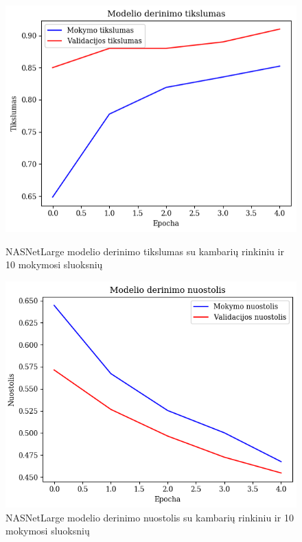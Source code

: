 \documentclass{VUMIFPSbakalaurinis}
\begin{document}
\begin{figure}[!htbp]
    \centering
    \begin{minipage}[b]{0.48\textwidth}
      \includegraphics[width=\textwidth]{img/GrapthsNEW/Large/room/10/Acc_R_L_10.png}
      \caption{NASNetLarge modelio derinimo tikslumas su kambarių rinkiniu ir 10 mokymosi sluoksnių}
    \end{minipage}
    \hspace{2mm}
    \begin{minipage}[b]{0.48\textwidth}
      \includegraphics[width=\textwidth]{img/GrapthsNEW/Large/room/10/Loss_R_L_10.png}
      \caption{NASNetLarge modelio derinimo nuostolis su kambarių rinkiniu ir 10 mokymosi sluoksnių}
    \end{minipage}
\end{figure}
\end{document}
